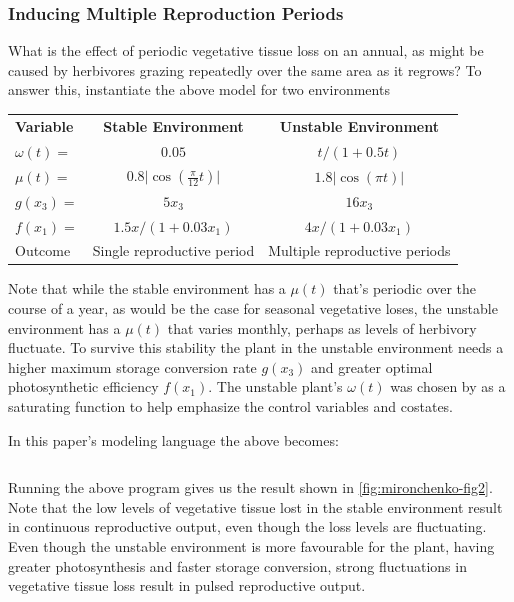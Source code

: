 \documentclass{article}
\begin{document}
\subsubsection{Inducing Multiple Reproduction Periods}
\label{sec:annual-multi}
What is the effect of periodic vegetative tissue loss on an annual, as might be caused by herbivores grazing repeatedly over the same area as it regrows? To answer this, \citeauthor{mironchenko_optimal_2014} instantiate the above model for two environments

\begin{center}
\begin{tabular}{lcc}
\textbf{Variable} & \textbf{Stable Environment}                 & \textbf{Unstable Environment}     \\
$\omega(t)=$      & $0.05$                                      & $t / (1 + 0.5 t)$                 \\
$\mu(t)=$         & $0.8 \lvert \cos(\frac{\pi}{12}t) \rvert$   & $1.8 \lvert \cos(\pi t) \rvert$   \\
$g(x_3)=$         & $5x_3$                                      & $16x_3$                           \\
$f(x_1)=$         & $1.5x/(1+0.03x_1)$                          & $4x/(1+0.03x_1)$                  \\
Outcome           & Single reproductive period                  & Multiple reproductive periods
\end{tabular}
\end{center}

Note that while the stable environment has a $\mu(t)$ that's periodic over the course of a year, as would be the case for seasonal vegetative loses, the unstable environment has a $\mu(t)$ that varies monthly, perhaps as levels of herbivory fluctuate. To survive this stability the plant in the unstable environment needs a higher maximum storage conversion rate $g(x_3)$ and greater optimal photosynthetic efficiency $f(x_1)$. The unstable plant's $\omega(t)$ was chosen by \citeauthor{mironchenko_optimal_2014} as a saturating function to help emphasize the control variables and costates.

In this paper's modeling language the above becomes:

\inputminted[firstline=5,frame=single,linenos]{python}{src/Mironchenko2014_figure2.py}

Running the above program gives us the result shown in \autoref{fig:mironchenko-fig2}. Note that the low levels of vegetative tissue lost in the stable environment result in continuous reproductive output, even though the loss levels are fluctuating. Even though the unstable environment is more favourable for the plant, having greater photosynthesis and faster storage conversion, strong fluctuations in vegetative tissue loss result in pulsed reproductive output.
\end{document}

